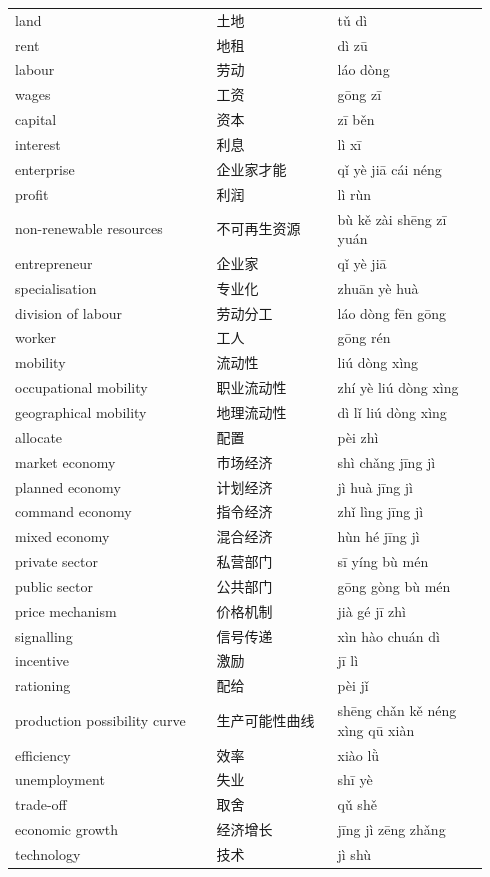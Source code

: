 \documentclass[11pt]{article}
\begin{document}
\begin{longtable}{@{}p{0.40\linewidth}p{0.24\linewidth}p{0.30\linewidth}@{}}
land & 土地 & tǔ dì \\
rent & 地租 & dì zū \\
labour & 劳动 & láo dòng \\
wages & 工资 & gōng zī \\
capital & 资本 & zī běn \\
interest & 利息 & lì xī \\
enterprise & 企业家才能 & qǐ yè jiā cái néng \\
profit & 利润 & lì rùn \\
non-renewable resources & 不可再生资源 & bù kě zài shēng zī yuán \\
entrepreneur & 企业家 & qǐ yè jiā \\
specialisation & 专业化 & zhuān yè huà \\
division of labour & 劳动分工 & láo dòng fēn gōng \\
worker & 工人 & gōng rén \\
mobility & 流动性 & liú dòng xìng \\
occupational mobility & 职业流动性 & zhí yè liú dòng xìng \\
geographical mobility & 地理流动性 & dì lǐ liú dòng xìng \\
allocate & 配置 & pèi zhì \\
market economy & 市场经济 & shì chǎng jīng jì \\
planned economy & 计划经济 & jì huà jīng jì \\
command economy & 指令经济 & zhǐ lìng jīng jì \\
mixed economy & 混合经济 & hùn hé jīng jì \\
private sector & 私营部门 & sī yíng bù mén \\
public sector & 公共部门 & gōng gòng bù mén \\
price mechanism & 价格机制 & jià gé jī zhì \\
signalling & 信号传递 & xìn hào chuán dì \\
incentive & 激励 & jī lì \\
rationing & 配给 & pèi jǐ \\
production possibility curve & 生产可能性曲线 & shēng chǎn kě néng xìng qū xiàn \\
efficiency & 效率 & xiào lǜ \\
unemployment & 失业 & shī yè \\
trade-off & 取舍 & qǔ shě \\
economic growth & 经济增长 & jīng jì zēng zhǎng \\
technology & 技术 & jì shù \\

\end{longtable}
\end{document}
